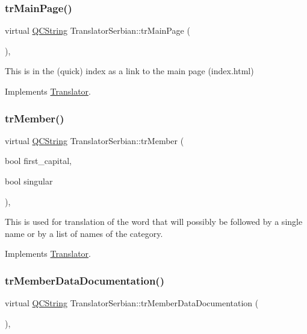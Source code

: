 \subsubsection{\texorpdfstring{trMainPage()}{trMainPage()}}
{\footnotesize\ttfamily virtual \mbox{\hyperlink{class_q_c_string}{Q\+C\+String}} Translator\+Serbian\+::tr\+Main\+Page (\begin{DoxyParamCaption}{ }\end{DoxyParamCaption})\hspace{0.3cm}{\ttfamily [inline]}, {\ttfamily [virtual]}}

This is in the (quick) index as a link to the main page (index.\+html) 

Implements \mbox{\hyperlink{class_translator}{Translator}}.

\mbox{\label{class_translator_serbian_ad713ea1da4fa403235c44e1510c91ee4}} 
\subsubsection{\texorpdfstring{trMember()}{trMember()}}
{\footnotesize\ttfamily virtual \mbox{\hyperlink{class_q_c_string}{Q\+C\+String}} Translator\+Serbian\+::tr\+Member (\begin{DoxyParamCaption}\item[{bool}]{first\+\_\+capital,  }\item[{bool}]{singular }\end{DoxyParamCaption})\hspace{0.3cm}{\ttfamily [inline]}, {\ttfamily [virtual]}}

This is used for translation of the word that will possibly be followed by a single name or by a list of names of the category. 

Implements \mbox{\hyperlink{class_translator}{Translator}}.

\mbox{\label{class_translator_serbian_a38b41a81acc35d80270efad6dcef6daa}} 
\subsubsection{\texorpdfstring{trMemberDataDocumentation()}{trMemberDataDocumentation()}}
{\footnotesize\ttfamily virtual \mbox{\hyperlink{class_q_c_string}{Q\+C\+String}} Translator\+Serbian\+::tr\+Member\+Data\+Documentation (\begin{DoxyParamCaption}{ }\end{DoxyParamCaption})\hspace{0.3cm}{\ttfamily [inline]}, {\ttfamily [virtual]}}


